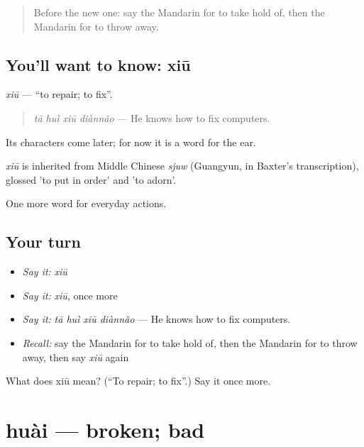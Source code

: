 \label{lesson:ZH-C103-xiu}



\begin{quote}
Before the new one: say the Mandarin for to take hold of, then the Mandarin for to throw away.
\end{quote}

\subsection*{You'll want to know: xiū}
\emph{xiū} — \textquotedblleft{}to repair; to fix\textquotedblright{}.

\begin{quote}
\emph{tā huì xiū diànnǎo} — He knows how to fix computers.
\end{quote}

Its characters come later; for now it is a word for the ear.

\begin{cousinweb}
\emph{xiū} is inherited from Middle Chinese \emph{sjuw} (Guangyun, in Baxter's transcription), glossed 'to put in order' and 'to adorn'.
\end{cousinweb}

\begin{grammarlens}[title={What you've built}]
One more word for everyday actions.
\end{grammarlens}

\subsection*{Your turn}
\begin{itemize}
\raggedright
  \item \emph{Say it:} \emph{xiū}
  \item \emph{Say it:} \emph{xiū}, once more
  \item \emph{Say it:} \emph{tā huì xiū diànnǎo} — He knows how to fix computers.
  \item \emph{Recall:} say the Mandarin for to take hold of, then the Mandarin for to throw away, then say \emph{xiū} again
\end{itemize}

\begin{tcolorbox}[breakable,colback=teal!4,colframe=teal!35!black,title={Before you move on}]
What does xiū mean? (\textquotedblleft{}To repair; to fix\textquotedblright{}.) Say it once more.
\end{tcolorbox}
\section[huài]{huài — broken; bad}

